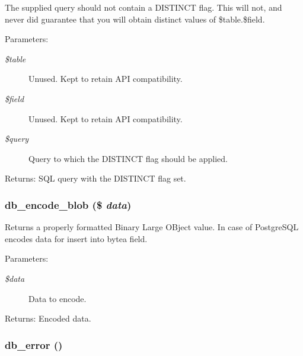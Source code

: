 The supplied query should not contain a DISTINCT flag. This will not, and never did guarantee that you will obtain distinct values of \$table.\$field.

\begin{Desc}
\item[Parameters:]
\begin{description}
\item[{\em \$table}]Unused. Kept to retain API compatibility. \item[{\em \$field}]Unused. Kept to retain API compatibility. \item[{\em \$query}]Query to which the DISTINCT flag should be applied.\end{description}
\end{Desc}
\begin{Desc}
\item[Returns:]SQL query with the DISTINCT flag set. \end{Desc}
\hypertarget{group__database_g464ab7b26ecfdddc68f3564ca609ac3f}{
\subsubsection[{db\_\-encode\_\-blob}]{\setlength{\rightskip}{0pt plus 5cm}db\_\-encode\_\-blob (\$ {\em data})}}
\label{group__database_g464ab7b26ecfdddc68f3564ca609ac3f}


Returns a properly formatted Binary Large OBject value. In case of PostgreSQL encodes data for insert into bytea field.

\begin{Desc}
\item[Parameters:]
\begin{description}
\item[{\em \$data}]Data to encode. \end{description}
\end{Desc}
\begin{Desc}
\item[Returns:]Encoded data. \end{Desc}
\hypertarget{group__database_g5acae04a62f1baa2e83d189e72071bfe}{
\subsubsection[{db\_\-error}]{\setlength{\rightskip}{0pt plus 5cm}db\_\-error ()}}
\label{group__database_g5acae04a62f1baa2e83d189e72071bfe}


